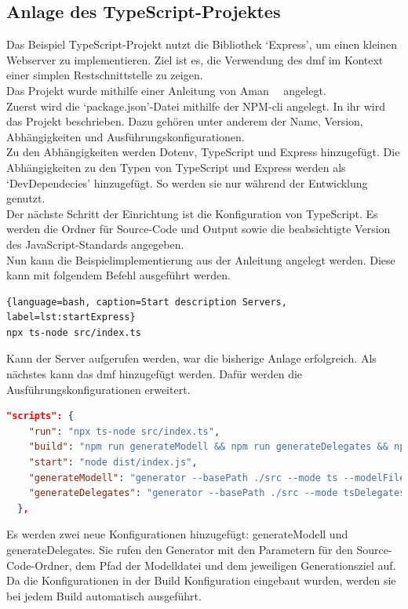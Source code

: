\documentclass[./einleitung.tex]{subfiles}
\begin{document}
    \subsection{Anlage des TypeScript-Projektes}\label{subsec:anlage-des-typescript-projektes}
    Das Beispiel TypeScript-Projekt nutzt die Bibliothek `Express', um einen kleinen Webserver zu implementieren.
    Ziel ist es, die Verwendung des \acrshort{dmf} im Kontext einer simplen Restschnittstelle zu zeigen.\\
    Das Projekt wurde mithilfe einer Anleitung von Aman~\citeauthor{initExpress}~\cite{initExpress} angelegt.\\
    Zuerst wird die `package.json'-Datei mithilfe der NPM-\acrshort{cli} angelegt.
    In ihr wird das Projekt beschrieben.
    Dazu gehören unter anderem der Name, Version, Abhängigkeiten und Ausführungskonfigurationen.\\
    Zu den Abhängigkeiten werden Dotenv, TypeScript und Express hinzugefügt.
    Die Abhängigkeiten zu den Typen von TypeScript und Express werden als `DevDependecies' hinzugefügt.
    So werden sie nur während der Entwicklung genutzt.\\
    Der nächste Schritt der Einrichtung ist die Konfiguration von TypeScript.
    Es werden die Ordner für Source-Code und Output sowie die beabsichtigte Version des JavaScript-Standards angegeben.\\
    Nun kann die Beispielimplementierung aus der Anleitung angelegt werden.
    Diese kann mit folgendem Befehl ausgeführt werden.
    \begin{lstlisting}{language=bash, caption=Start description Servers, label=lst:startExpress}
npx ts-node src/index.ts
    \end{lstlisting}
    Kann der Server aufgerufen werden, war die bisherige Anlage erfolgreich.
    Als nächstes kann das \acrshort{dmf} hinzugefügt werden.
    Dafür werden die Ausführungskonfigurationen erweitert.
    \begin{lstlisting}[language=json, caption=Ausführungskonfigurationen in package.json, label=lst:packageScripts]
"scripts": {
    "run": "npx ts-node src/index.ts",
    "build": "npm run generateModell && npm run generateDelegates && npx tsc",
    "start": "node dist/index.js",
    "generateModell": "generator --basePath ./src --mode ts --modelFile ../Modell/domain.dmf",
    "generateDelegates": "generator --basePath ./src --mode tsDelegates --modelFile ../Modell/domain.dmf",
  },
    \end{lstlisting}
    Es werden zwei neue Konfigurationen hinzugefügt: generateModell und generateDelegates.
    Sie rufen den Generator mit den Parametern für den Source-Code-Ordner, dem Pfad der Modelldatei und dem jeweiligen Generationsziel auf.
    Da die Konfigurationen in der Build Konfiguration eingebaut wurden, werden sie bei jedem Build automatisch ausgeführt.
\end{document}
